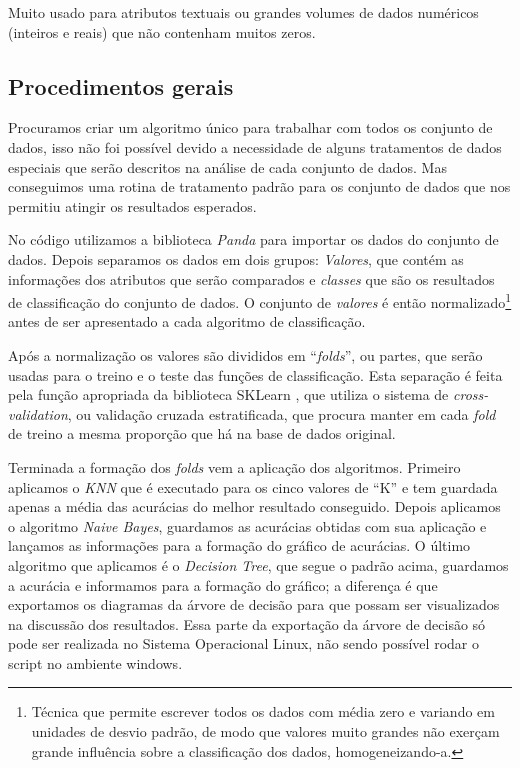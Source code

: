 \documentclass[12pt, a4paper]{article}
\begin{document}
Muito usado para atributos textuais ou grandes volumes de dados numéricos (inteiros e reais) que não contenham muitos zeros.

\subsection{Procedimentos gerais}
Procuramos criar um algoritmo único para trabalhar com todos os conjunto de dados, isso não foi possível devido a necessidade de alguns tratamentos de dados especiais que serão descritos na análise de cada conjunto de dados. Mas conseguimos uma rotina de tratamento padrão para os conjunto de dados que nos permitiu atingir os resultados esperados.

No código utilizamos a biblioteca \emph{Panda} \citep{mckinney-proc-scipy-2010} para importar os dados do conjunto de dados. Depois separamos os dados em dois grupos: \emph{Valores}, que contém as informações dos atributos que serão comparados e \emph{classes} que são os resultados de classificação do conjunto de dados. O conjunto de \emph{valores} é então normalizado\footnote{Técnica que permite escrever todos os dados com média zero e variando em unidades de desvio padrão, de modo que valores muito  grandes não exerçam grande influência sobre a classificação dos dados, homogeneizando-a.} antes de ser apresentado a cada algoritmo de classificação.

Após a normalização os valores são divididos em ``\textit{folds}'', ou partes, que serão usadas para o treino e o teste das funções de classificação. Esta separação é feita pela função apropriada da biblioteca SKLearn \cite{scikit-learn}, que utiliza o sistema de \emph{cross-validation}, ou validação cruzada estratificada, que procura manter em cada \textit{fold} de treino a mesma proporção que há na base de dados original.

Terminada a formação dos \textit{folds} vem a aplicação dos algoritmos. Primeiro aplicamos o \textit{KNN} que é executado para os cinco valores de ``K'' e tem guardada apenas a média das acurácias do melhor resultado conseguido. Depois aplicamos o algoritmo \emph{Naive Bayes}, guardamos as acurácias obtidas com sua aplicação e lançamos as informações para a formação do gráfico de acurácias. O último algoritmo que aplicamos é o \textit{Decision Tree}, que segue o padrão acima, guardamos a acurácia e informamos para a formação do gráfico; a diferença é que exportamos os diagramas da árvore de decisão para que possam ser visualizados na discussão dos resultados. Essa parte da exportação da árvore de decisão só pode ser realizada no Sistema Operacional Linux, não sendo possível rodar o script no ambiente windows.
\end{document}
